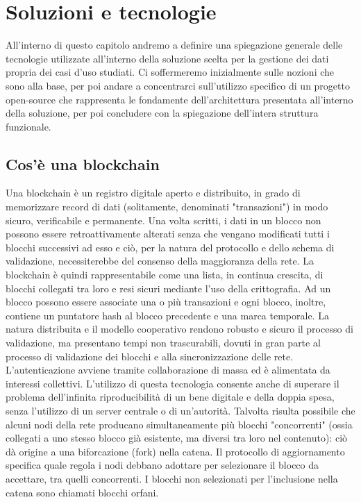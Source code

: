 \chapter{Soluzioni e tecnologie}
All'interno di questo capitolo andremo a definire una spiegazione generale delle tecnologie utilizzate all'interno della soluzione scelta per la gestione dei dati propria dei casi d'uso studiati. Ci soffermeremo inizialmente sulle nozioni che sono alla base, per poi andare a concentrarci sull'utilizzo specifico di un progetto open-source che rappresenta le fondamente dell'architettura presentata all'interno della soluzione, per poi concludere con la spiegazione dell'intera struttura funzionale.
\section{Cos'è una blockchain}
Una blockchain è un registro digitale aperto e distribuito, in grado di memorizzare record di dati (solitamente, denominati "transazioni") in modo sicuro, verificabile e permanente. Una volta scritti, i dati in un blocco non possono essere retroattivamente alterati senza che vengano modificati tutti i blocchi successivi ad esso e ciò, per la natura del protocollo e dello schema di validazione, necessiterebbe del consenso della maggioranza della rete. La blockchain è quindi rappresentabile come una lista, in continua crescita, di blocchi collegati tra loro e resi sicuri mediante l'uso della crittografia. Ad un blocco possono essere associate una o più transazioni e ogni blocco, inoltre, contiene un puntatore hash al blocco precedente e una marca temporale.
La natura distribuita e il modello cooperativo rendono robusto e sicuro il processo di validazione, ma presentano tempi non trascurabili, dovuti in gran parte al processo di validazione dei blocchi e alla sincronizzazione delle rete. L'autenticazione avviene tramite collaborazione di massa ed è alimentata da interessi collettivi. L'utilizzo di questa tecnologia consente anche di superare il problema dell'infinita riproducibilità di un bene digitale e della doppia spesa, senza l'utilizzo di un server centrale o di un'autorità.
Talvolta risulta possibile che alcuni nodi della rete producano simultaneamente più blocchi "concorrenti" (ossia collegati a uno stesso blocco già esistente, ma diversi tra loro nel contenuto): ciò dà origine a una biforcazione (fork) nella catena. Il protocollo di aggiornamento specifica quale regola i nodi debbano adottare per selezionare il blocco da accettare, tra quelli concorrenti. I blocchi non selezionati per l'inclusione nella catena sono chiamati blocchi orfani.
